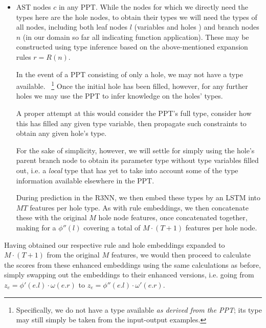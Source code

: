 \documentclass{article}
\begin{document}
\begin{itemize}
    \item AST nodes $c$ in any PPT.
    While the nodes for which we directly need the types here are the hole nodes,
    to obtain their types we will need the types of all nodes,
    including both leaf nodes $l$ (variables and holes%
    )
    and branch nodes $n$ (in our domain so far all indicating function application).
    These may be constructed using type inference based on the above-mentioned expansion rules $r=R(n)$.

    In the event of a PPT consisting of only a hole,
    we may not have a type available.%
    ~\footnote{
        Specifically, we do not have a type available \emph{as derived from the PPT};
        its type may still simply be taken from the input-output examples.
    }
    Once the initial hole has been filled, however,
    for any further holes we may use the PPT to infer knowledge on the holes' types.

    A proper attempt at this would consider the PPT's full type,
    consider how this has filled any given type variable,
    then propagate such constraints to obtain any given hole's type.

    For the sake of simplicity, however, we will settle for simply using the hole's
    parent branch node to obtain its parameter type without type variables filled out,
    i.e. a \emph{local} type that has yet to take into account some of the type information available elsewhere in the PPT.

    During prediction in the R3NN, we then embed these types by an LSTM into $MT$ features per hole type.
    As with rule embeddings, we then concatenate these with the original $M$ hole node features,
    once concatenated together, making for a $\phi''(l)$ covering a total of $M \cdot (T+1)$ features per hole node.

\end{itemize}

Having obtained our respective rule and hole embeddings expanded to $M \cdot (T+1)$ from the original $M$ features,
we would then proceed to calculate the scores from these enhanced embeddings using the same calculations as before,
simply swapping out the embeddings to their enhanced versions,
i.e. going from $z_e = \phi'(e.l) \cdot \omega(e.r)$ to $z_e = \phi''(e.l) \cdot \omega'(e.r)$.
\end{document}
